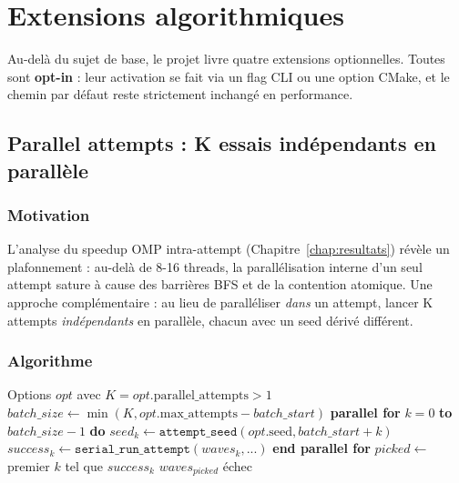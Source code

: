 \chapter{Extensions algorithmiques}
\label{chap:extensions}

Au-delà du sujet de base, le projet livre quatre extensions optionnelles. Toutes sont \textbf{opt-in} : leur activation se fait via un flag CLI ou une option CMake, et le chemin par défaut reste strictement inchangé en performance.

\section{Parallel attempts : K essais indépendants en parallèle}

\subsection{Motivation}

L'analyse du speedup OMP intra-attempt (Chapitre~\ref{chap:resultats}) révèle un plafonnement : au-delà de 8-16 threads, la parallélisation interne d'un seul attempt sature à cause des barrières BFS et de la contention atomique. Une approche complémentaire : au lieu de paralléliser \textit{dans} un attempt, lancer K attempts \textit{indépendants} en parallèle, chacun avec un seed dérivé différent.

\subsection{Algorithme}

\begin{algorithm}[H]
\caption{Parallel attempts orchestration}
\begin{algorithmic}[1]
\Require Options $opt$ avec $K = opt.\text{parallel\_attempts} > 1$
    \State $batch\_size \gets \min(K, opt.\text{max\_attempts} - batch\_start)$
    \State \textbf{parallel for} $k = 0$ \textbf{to} $batch\_size - 1$ \textbf{do}
        \State \quad $seed_k \gets \texttt{attempt\_seed}(opt.\text{seed}, batch\_start + k)$
        \State \quad $success_k \gets \texttt{serial\_run\_attempt}(waves_k, ...)$
    \State \textbf{end parallel for}
    \State $picked \gets$ premier $k$ tel que $success_k$
        \State \Return $waves_{picked}$
    \EndIf
\EndFor
\State \Return échec
\end{algorithmic}
\end{algorithm}

